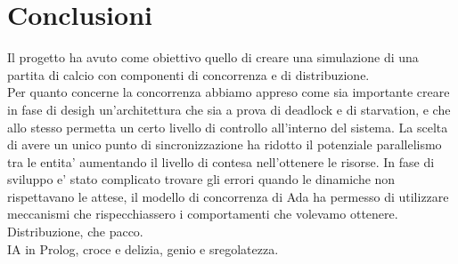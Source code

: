 
\section*{Conclusioni}
%
\label{sec:conclusioni}

Il progetto ha avuto come obiettivo quello di creare una simulazione di una partita di calcio con componenti di concorrenza e di distribuzione.\\

Per quanto concerne la concorrenza abbiamo appreso come sia importante creare in fase di desigh un'architettura che sia a prova di deadlock e di starvation, e che allo stesso permetta un certo livello di controllo all'interno del sistema. La scelta di avere un unico punto di sincronizzazione ha ridotto il potenziale parallelismo tra le entita' aumentando il livello di contesa nell'ottenere le risorse. In fase di sviluppo e' stato complicato trovare gli errori quando le dinamiche non rispettavano le attese, il modello di concorrenza di Ada ha permesso di utilizzare meccanismi che rispecchiassero i comportamenti che volevamo ottenere.\\

Distribuzione, che pacco.\\

IA in Prolog, croce e delizia, genio e sregolatezza.